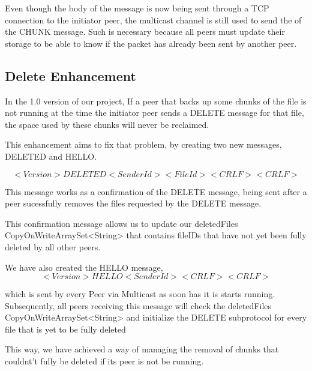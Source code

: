 \documentclass[11pt]{article}
\begin{document}
Even though the body of the message is now being sent through a TCP connection to the initiator peer, the multicast channel is still used to send the of the 
CHUNK message. Such is necessary because all peers must update their storage to be able to know if the packet has already been sent by another peer.



\subsection{Delete Enhancement}

In the 1.0 version of our project, If a peer that backs up some chunks of the file is not running at the time the initiator peer sends a DELETE message for that file, the space used by these chunks will never be reclaimed.

This enhancement aims to fix that problem, by creating two new messages, DELETED and HELLO.

\[<Version> DELETED <SenderId> <FileId> <CRLF><CRLF>\]

This message works as a confirmation of the DELETE message, being sent after a peer sucessfully removes the files requested by the DELETE message.

This confirmation message allows us to update our deletedFiles CopyOnWriteArraySet<String> that contains fileIDs that have not yet been fully deleted by all other peers.

We have also created the HELLO message,
\[<Version> HELLO <SenderId> <CRLF><CRLF>\]

which is sent by every Peer via Multicast as soon has it is starts running. Subsequently, all peers receiving this message 
will check the deletedFiles CopyOnWriteArraySet<String> and initialize the DELETE subprotocol for every file that is yet to be fully deleted

This way, we have achieved a way of managing the removal of chunks that couldnt't fully be deleted if its peer is not be running.
\end{document}
